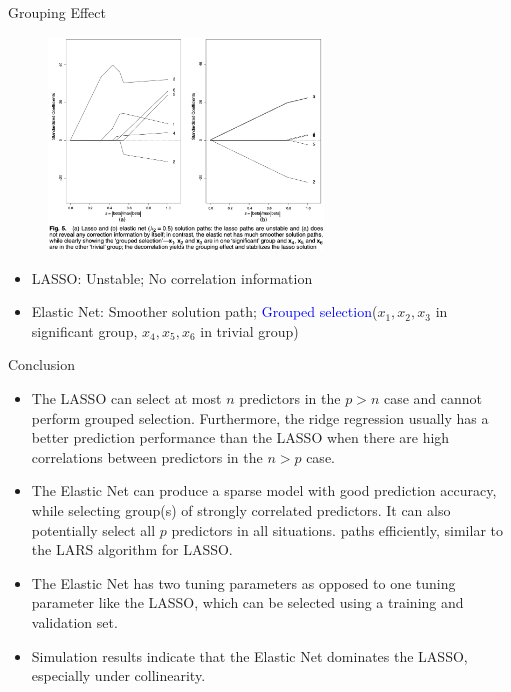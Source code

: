     \begin{frame}{Grouping Effect}
        \begin{figure}
            \centering
            \includegraphics[width=0.65\textwidth]{img/Fig 5.png}
            \label{fig:enter-label}
        \end{figure}
        \begin{itemize}
            \item LASSO: Unstable; No correlation information
            \item Elastic Net: Smoother solution path; \textcolor{blue}{Grouped selection}($x_1,x_2,x_3$ in significant group, $x_4,x_5,x_6$ in trivial group)
        \end{itemize}
    \end{frame}
    
    \begin{frame}{Conclusion}
    \begin{itemize}
        \item The LASSO can select at most $n$ predictors in the $p>n$ case and cannot perform grouped selection. Furthermore, the ridge regression usually has a better prediction performance than the LASSO when there are high correlations between predictors in the $n>p$ case.
        \item The Elastic Net can produce a sparse model with good prediction accuracy, while
 selecting group(s) of strongly correlated predictors. It can also potentially select all $p$
 predictors in all situations.
 paths efficiently, similar to the LARS algorithm for LASSO.
        \item The Elastic Net has two tuning parameters as opposed to one tuning parameter like the LASSO, which can be selected using a training and validation set.
        \item Simulation results indicate that the Elastic Net dominates the LASSO, especially
 under collinearity.
    \end{itemize}
        
    \end{frame}

